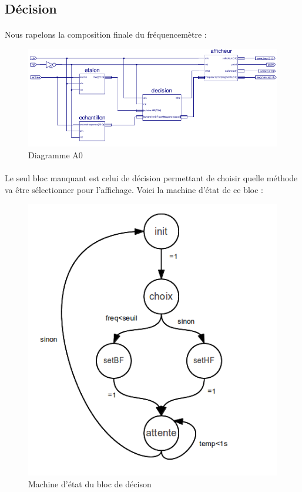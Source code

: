 \documentclass[a4paper,11pt]{article}
\begin{document}
  \subsection{Décision}
 \paragraph{} Nous rapelons la composition finale du fréquencemètre :
 
\begin{figure}[H]
\begin{center}
	\includegraphics[scale=.9]{sch-frequencemetre.png}
	\caption{Diagramme A0}
\end{center}
\end{figure}

  \paragraph{}Le seul bloc manquant est celui de décision permettant de choisir quelle méthode va être 
  sélectionner pour l'affichage. Voici la machine d'état de ce bloc :
  
   \begin{figure}[H]
\begin{center}
	\includegraphics[scale=.6]{machine_decision.png}
	\caption{Machine d'état du bloc de décison}
\end{center}
\end{figure}
  
\end{document}
